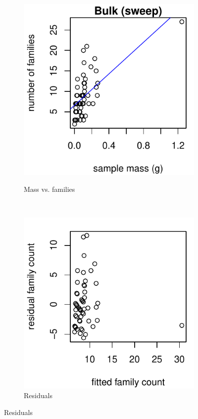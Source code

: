 \documentclass[10pt,letterpaper,twocolumn]{article}
\begin{document}
\begin{figure}[h]
	\centering
	\begin{subfigure}[b]{0.15\textwidth}
		\caption{Mass vs. families}
		\includegraphics[width=\textwidth]{plots/bulk/2015_bulk_sweep_scatter.pdf}
		\label{fig:bulk_sweep_scatter}
	\end{subfigure}
	~
	\begin{subfigure}[b]{0.15\textwidth}
		\caption{Residuals}
		\includegraphics[width=\textwidth]{plots//bulk/2015_bulk_sweep_residual.pdf}

\end{subfigure}
\end{figure}
\end{document}
